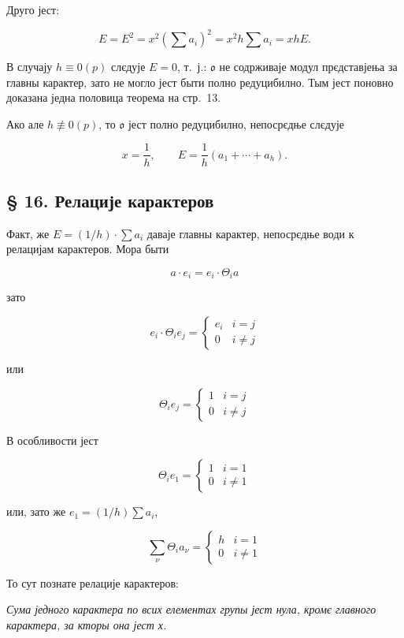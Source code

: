 \documentclass[11pt]{article}
\begin{document}
Друго јест:

\[
E=E^2=x^2\left(\sum a_i\right)^2=x^2h\sum a_i=xhE.
\]

В случају \(h\equiv0(p)\) слєдује \(E=0\), т.~ј.: \(\mathfrak o\) не содрживаје модул прєдставјења за главны карактер, зато не могло јест быти полно редуцибилно. Тым јест поновно доказана једна половица теорема на стр.~13.

Ако але \(h\not\equiv0(p)\), то \(\mathfrak o\) јест полно редуцибилно, непосрєдње слєдује

\[
x=\frac{1}{h},\qquad E=\frac{1}{h}(a_1+\cdots+a_h).
\]

\subsection*{§ 16. Релације карактеров}\label{die-charakterenrelationen}

Факт, же \(E=(1/h)\cdot\sum a_i\) даваје главны карактер, непосрєдње води к релацијам карактеров. Мора быти

\[a \cdot e_i = e_i \cdot \Theta_i a\]

зато

\[e_i \cdot \Theta_i e_j = \begin{cases} e_i & i = j \\ 0 & i \neq j \end{cases}\]

или

\[\Theta_i e_j = \begin{cases} 1 & i = j \\ 0 & i \neq j \end{cases}\]

В особливости јест

\[\Theta_i e_1 = \begin{cases} 1 & i = 1 \\ 0 & i \neq 1 \end{cases}\]

или, зато же \(e_1 = (1/h) \sum a_i\),

\[
\sum_\nu \Theta_i a_\nu=\begin{cases} h & i=1\\ 0 & i\ne 1 \end{cases}
\]

То сут познате релације карактеров:

\emph{Сума једного карактера по всих елементах групы јест нула, кромє главного карактера, за кторы она јест х.}
\end{document}
